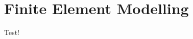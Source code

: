 \documentclass[report.tex]{subfiles}
\begin{document}
\section{Finite Element Modelling}
Test!
\end{document}
